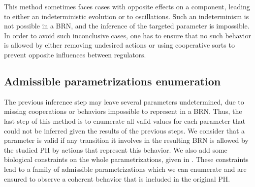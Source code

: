 This method sometimes faces cases with opposite effects on a component, leading to either an indeterministic evolution or to oscillations.
Such an indeterminism is not possible in a BRN, and the inference of the targeted parameter is impossible.
In order to avoid such inconclusive cases, one has to ensure that no such behavior is allowed
by either removing undesired actions or using cooperative sorts to prevent opposite influences between regulators.

\subsection{Admissible parametrizations enumeration}\label{ssec:admissible-K}

The previous inference step may leave several parameters undetermined, due to missing cooperations or behaviors impossible to represent in a BRN.
Thus, the last step of this method is to enumerate all valid values for each parameter that could not be inferred given the results of the previous steps.
We consider that a parameter is valid if any transition it involves in the resulting BRN is allowed by the studied PH by actions that represent this behavior.
We also add some biological constraints on the whole parametrizations, given in \cite{BernotSemBRN}.
These constraints lead to a family of admissible parametrizations which we can enumerate and are ensured to observe a coherent behavior that is included in the original PH.

\begin{comment}
This approach can be considered as abductive reasoning as some information is added by the enumeration.
If we denote:
\begin{itemize}
  \item $M$ the fact that the behavior of the resulting BRN observes the dynamics of the PH,
  \item $B$ the fact (which is granted) that the IG and the series of necessary parameters inferred from the PH are parts of the resulting BRN,
  \item $H_K$ the hypothesis that $K$ is an admissible complete parametrization,
\end{itemize}
then the parametrizations $K$ that answer our expectations are the ones so that:
\begin{itemize}
  \item $H_K$ is compatible with $B$, that is, all parameters of $K$ are compatible with the inferred parameters,
  \item $B \wedge H_K \models M$, that is, the inferred IG together with $K$ represent a BRN observing the behavior included into the dynamics of the original PH.
\end{itemize}
\end{comment}

